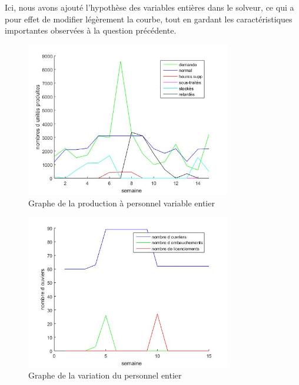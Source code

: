Ici, nous avons ajouté l'hypothèse des variables entières dans le solveur, ce qui a pour effet de modifier légèrement la courbe, tout en gardant les caractéristiques importantes observées à la question précédente.

\begin{figure}[H]
    \centering
    \includegraphics[width=0.8\textwidth]{graphes/graphq9.jpg}
    \caption{Graphe de la production à personnel variable entier}
    \label{fig:q8_01}
\end{figure}

\begin{figure}[H]
    \centering
    \includegraphics[width=0.8\textwidth]{graphes/ouvrierq9.jpg}
    \caption{Graphe de la variation du personnel entier}
    \label{fig:q8_02}
\end{figure}
